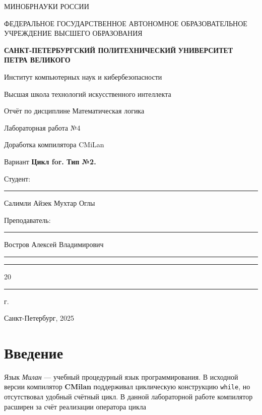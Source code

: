 \documentclass[areasetadvanced]{scrartcl}
\begin{document}
\sloppy
	\thispagestyle{empty}
	\begin{center}
		\large{МИНОБРНАУКИ РОССИИ} \par
		\vspace{0.3cm}
		\normalsize
		{ФЕДЕРАЛЬНОЕ ГОСУДАРСТВЕННОЕ АВТОНОМНОЕ ОБРАЗОВАТЕЛЬНОЕ УЧРЕЖДЕНИЕ ВЫСШЕГО ОБРАЗОВАНИЯ} \par
		\vspace{0.3cm}
		\textbf{\guillemotleft САНКТ-ПЕТЕРБУРГСКИЙ ПОЛИТЕХНИЧЕСКИЙ}
		\textbf{УНИВЕРСИТЕТ ПЕТРА ВЕЛИКОГО\guillemotright} \par
		\vspace{0.3cm}
		{Институт компьютерных наук и кибербезопасности}\par
		{Высшая школа технологий искусственного интеллекта}\par
	\end{center}
	\vfill
	\begin{center}
		{\large Отчёт по дисциплине \guillemotleft Математическая логика\guillemotright}\par
		{\huge   Лабораторная работа №4
		
		\guillemotleft Доработка компилятора CMiLan\guillemotright}\par
            {\huge Вариант \textbf{Цикл for. Тип №2.}}
         
	\end{center}
	\vfill
	\begin{flushleft}
		Студент: \hspace{1.8cm} \rule[0pt]{2.5cm}{0.5pt}\hfill Салимли Айзек Мухтар Оглы\par
		\vspace{1.5cm}
		Преподаватель: \hspace{0.55cm} \rule[0pt]{2.5cm}{0.5pt}\hfill  Востров Алексей Владимирович
	\end{flushleft}
	\vspace{0.5cm}
	\begin{flushright}
		\guillemotleft \rule[0pt]{0.8cm}{0.5pt}\guillemotright \rule[0pt]{2cm}{0.5pt} 20\rule[0pt]{0.5cm}{0.5pt} г.
	\end{flushright}
	\vfill
	\begin{center}
		Санкт-Петербург, 2025
	\end{center}
	\newpage
	\tableofcontents
	\newpage

    \section*{Введение}
    Язык \emph{Милан} --- учебный процедурный язык программирования.  
    В исходной версии компилятор \textbf{CMilan} поддерживал циклическую конструкцию
    \texttt{while}, но отсутствовал удобный счётный цикл.  
    В данной лабораторной работе компилятор расширен за счёт
    реализации оператора цикла
    
\end{document}

